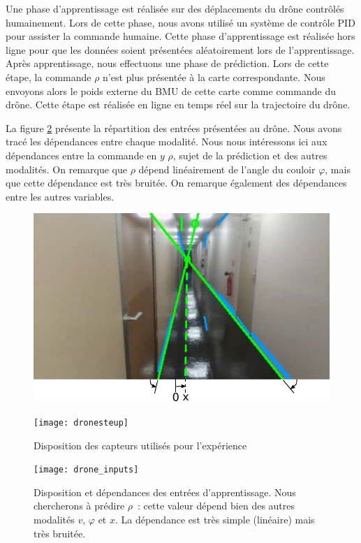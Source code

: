 \documentclass[../main]{subfiles}
\begin{document}
Une phase d'apprentissage est réalisée sur des déplacements du drône contrôlés humainement. Lors de cette phase, nous avons utilisé un système de contrôle PID pour assister la commande humaine.
Cette phase d'apprentissage est réalisée hors ligne pour que les données soient présentées aléatoirement lors de l'apprentissage.
Après apprentissage, nous effectuons une phase de prédiction. Lors de cette étape, la commande $\rho$ n'est plus présentée à la carte correspondante. 
Nous envoyons alors le poids externe du BMU de cette carte comme commande du drône. Cette étape est réalisée en ligne en temps réel sur la trajectoire du drône.

La figure \ref{fig:drone_inp} présente la répartition des entrées présentées au drône. Nous avons tracé les dépendances entre chaque modalité. Nous nous intéressons ici aux dépendances entre la commande en $y$ $\rho$, sujet de la prédiction et des autres modalités.
On remarque que $\rho$ dépend linéairement de l'angle du couloir $\varphi$, mais que cette dépendance est très bruitée. 
On remarque également des dépendances entre les autres variables.

\begin{figure}
	\begin{minipage}{0.5\textwidth}
	\includegraphics[width=\textwidth]{visudrone}
	\end{minipage}
	\begin{minipage}{0.5\textwidth}
	\texttt{[image: dronesteup]}
	\end{minipage}
	\caption{Disposition des capteurs utilisés pour l'expérience}
	\label{fig:drone}
	\end{figure}

\begin{figure}
	\centering\texttt{[image: drone\_inputs]}
	\caption{Disposition et dépendances des entrées d'apprentissage. Nous chercherons à prédire $\rho$~: cette valeur dépend bien des autres modalités $v$, $\varphi$ et $x$. La dépendance est très simple (linéaire) mais très bruitée. \label{fig:drone_inp}}
\end{figure}
\end{document}
